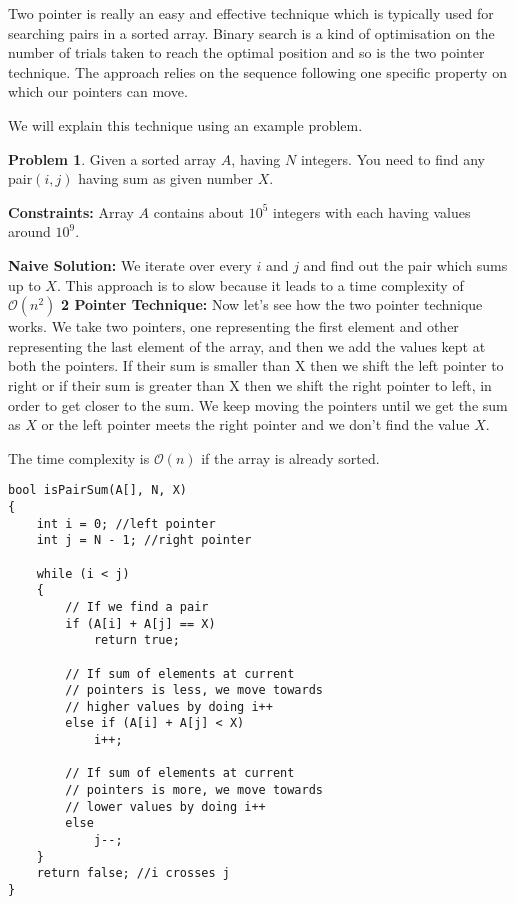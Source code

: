 \documentclass[twoside,12pt,a4paper,english]{book}
\theoremstyle{definition}
\theoremstyle{problemstyle}
\newtheorem*{problem}{Problem} %
\theoremstyle{problemstyle}
\theoremstyle{problemstyle}
\begin{document}
Two pointer is really an easy and effective technique which is typically used for searching pairs in a sorted array. Binary search is a kind of optimisation on the number of trials taken to reach the optimal position and so is the two pointer technique. The approach relies on the sequence following one specific property on which our pointers can move.

We will explain this technique using an example problem.

\begin{problem}
Given a sorted array $A$, having $N$ integers. You need to find any pair$(i,j)$ having sum as given number $X$.
\end{problem}

\textbf{Constraints:} Array $A$ contains about $10^5$ integers with each having values around $10^9$.

\begin{tcolorbox}[breakable, title=Solution]
\textbf{Naive Solution:} We iterate over every $i$ and $j$ and find out the pair which sums up to $X$. This approach is to slow because it leads to a time complexity of $\mathcal{O}(n^2)$
\tcblower
\textbf{2 Pointer Technique:} Now let’s see how the two pointer technique works. We take two pointers, one representing the first element and other representing the last element of the array, and then we add the values kept at both the pointers. If their sum is smaller than X then we shift the left pointer to right or if their sum is greater than X then we shift the right pointer to left, in order to get closer to the sum. We keep moving the pointers until we get the sum as $X$ or the left pointer meets the right pointer and we don't find the value $X$.

The time complexity is $\mathcal{O}(n)$ if the array is already sorted.
\newpage
\begin{lstlisting}
bool isPairSum(A[], N, X) 
{
    int i = 0; //left pointer 
    int j = N - 1; //right pointer
  
    while (i < j) 
    { 
        // If we find a pair 
        if (A[i] + A[j] == X) 
            return true; 

        // If sum of elements at current 
        // pointers is less, we move towards 
        // higher values by doing i++ 
        else if (A[i] + A[j] < X) 
            i++; 
  
        // If sum of elements at current 
        // pointers is more, we move towards 
        // lower values by doing i++ 
        else
            j--; 
    } 
    return false; //i crosses j
}
\end{lstlisting}
\end{tcolorbox}
\end{document}

